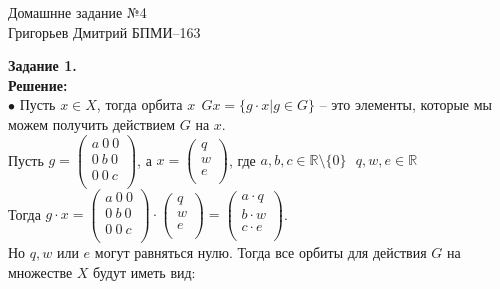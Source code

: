 \documentclass[12pt,a4paper]{scrartcl}
\begin{document}
	\begin{center}	
		Домашнне задание №4 \\
		Григорьев Дмитрий БПМИ--163
	\end{center}
	\textbf{Задание 1.}
	\\
	\textbf{Решение:}
	\\
	\indent
	$\bullet$ Пусть $x \in X$, тогда орбита $x~~Gx = \{g \cdot x | g \in G\}$ -- это элементы, которые мы можем получить действием $G$ на $x$.\\
	Пусть $g = \begin{pmatrix}
	a~0~0\\
	0~b~0\\
	0~0~c\\
	\end{pmatrix}$, а $x = \begin{pmatrix}
	q\\
	w\\
	e\\
	\end{pmatrix}$, где $a, b, c \in \mathbb{R} \setminus \{0\}~~~ q, w, e \in \mathbb{R}$\\
	Тогда $g \cdot x = \begin{pmatrix}
	a~0~0\\
	0~b~0\\
	0~0~c\\
	\end{pmatrix} \cdot \begin{pmatrix}
	q\\
	w\\
	e\\
	\end{pmatrix} = \begin{pmatrix}
	a\cdot q\\
	b \cdot w\\
	c \cdot e\\
	\end{pmatrix}$.\\
	Но $q, w$ или $e$ могут равняться нулю. Тогда все орбиты  для действия $G$ на множестве $X$ будут иметь вид:
\end{document}
